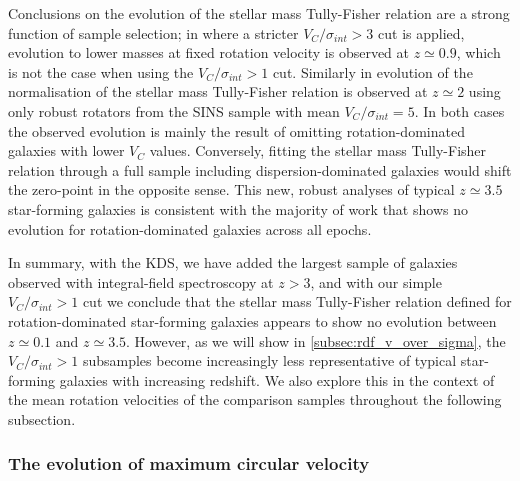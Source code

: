 \documentclass[fleqn,usenatbib]{mnras}
\begin{document}
Conclusions on the evolution of the stellar mass Tully-Fisher relation are a strong function of sample selection; in \cite{Tiley2016} where a stricter $V_{C}/\sigma_{int} > 3$ cut is applied, evolution to lower masses at fixed rotation velocity is observed at $z\simeq0.9$, which is not the case when using the $V_{C}/\sigma_{int} > 1$ cut.
Similarly in \cite{Cresci2009} evolution of the normalisation of the stellar mass Tully-Fisher relation is observed at $z\simeq2$ using only robust rotators from the SINS sample with mean $V_{C}/\sigma_{int} = 5$.
In both cases the observed evolution is mainly the result of omitting rotation-dominated galaxies with lower $V_{C}$ values.
Conversely, fitting the stellar mass Tully-Fisher relation through a full sample including dispersion-dominated galaxies would shift the zero-point in the opposite sense.
This new, robust analyses of typical $z\simeq3.5$ star-forming galaxies is consistent with the majority of work that shows no evolution for rotation-dominated galaxies across all epochs.


In summary, with the KDS, we have added the largest sample of galaxies observed with integral-field spectroscopy at $z>3$, and with our simple $V_{C}/\sigma_{int} > 1$ cut we conclude that the stellar mass Tully-Fisher relation defined for rotation-dominated star-forming galaxies appears to show no evolution between $z\simeq0.1$ and $z\simeq3.5$.
However, as we will show in \cref{subsec:rdf_v_over_sigma}, the $V_{C}/\sigma_{int} > 1$ subsamples become increasingly less representative of typical star-forming galaxies with increasing redshift.
We also explore this in the context of the mean rotation velocities of the comparison samples throughout the following subsection. 

\subsubsection{The evolution of maximum circular velocity}\label{subsubsec:v_evolution}
\end{document}
